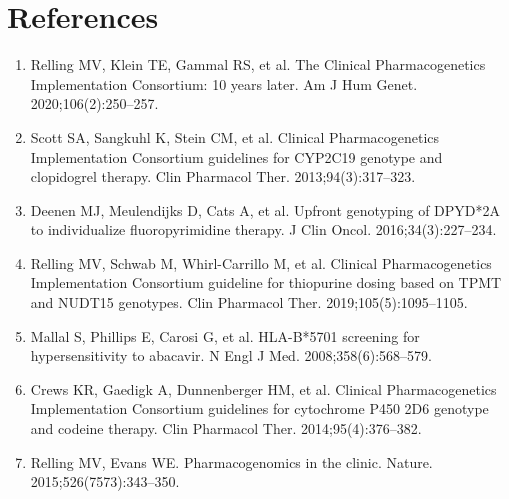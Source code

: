 \section*{References}
\begin{enumerate}
  \item Relling MV, Klein TE, Gammal RS, et al. The Clinical Pharmacogenetics Implementation Consortium: 10 years later. Am J Hum Genet. 2020;106(2):250--257.
  \item Scott SA, Sangkuhl K, Stein CM, et al. Clinical Pharmacogenetics Implementation Consortium guidelines for CYP2C19 genotype and clopidogrel therapy. Clin Pharmacol Ther. 2013;94(3):317--323.
  \item Deenen MJ, Meulendijks D, Cats A, et al. Upfront genotyping of DPYD*2A to individualize fluoropyrimidine therapy. J Clin Oncol. 2016;34(3):227--234.
  \item Relling MV, Schwab M, Whirl-Carrillo M, et al. Clinical Pharmacogenetics Implementation Consortium guideline for thiopurine dosing based on TPMT and NUDT15 genotypes. Clin Pharmacol Ther. 2019;105(5):1095--1105.
  \item Mallal S, Phillips E, Carosi G, et al. HLA-B*5701 screening for hypersensitivity to abacavir. N Engl J Med. 2008;358(6):568--579.
  \item Crews KR, Gaedigk A, Dunnenberger HM, et al. Clinical Pharmacogenetics Implementation Consortium guidelines for cytochrome P450 2D6 genotype and codeine therapy. Clin Pharmacol Ther. 2014;95(4):376--382.
  \item Relling MV, Evans WE. Pharmacogenomics in the clinic. Nature. 2015;526(7573):343--350.
\end{enumerate}

\clearpage

